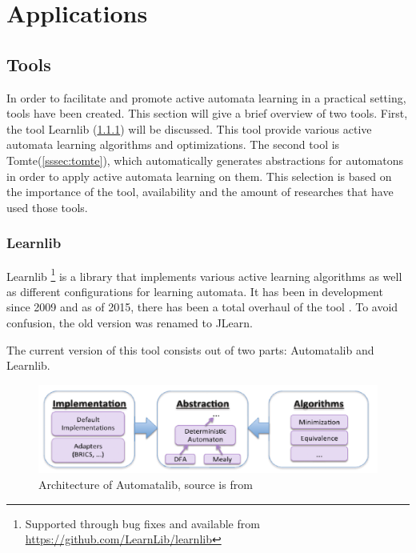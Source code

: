 \documentclass[multi,crop=false,class=article]{standalone}
\begin{document}
\section{Applications}
\label{sec:applications}


\subsection{Tools}
\label{ssec:tools}

In order to facilitate and promote active automata learning in a practical 
setting, tools have been created. This section will give a brief overview of
two tools. First, the tool Learnlib (\ref{sssec:learnlib}) will be discussed. 
This tool provide various active automata learning algorithms and 
optimizations. The second tool is Tomte(\ref{sssec:tomte}), which automatically 
generates abstractions for automatons in order to apply active automata 
learning on them. This selection is based on the importance of the tool, 
availability and the amount of researches that have used those tools.

\subsubsection{Learnlib}
\label{sssec:learnlib}

Learnlib  \footnote{Supported through bug fixes and available from 
\url{https://github.com/LearnLib/learnlib}} is a library that implements 
various active 
learning algorithms as well as different configurations for learning 
automata. It has been in development since 2009 \cite{Raffelt2009} and as of 
2015, there has been a total overhaul of the tool \cite{Isberner2015}. To avoid 
confusion, the old version was renamed to JLearn. 

The current version of this tool consists out of two parts: Automatalib and 
Learnlib.

\begin{figure}[!ht]
	\includegraphics[width=\textwidth]{Tool_images/automatalib_architecture.png}
	\caption{Architecture of Automatalib, source is from \cite{Isberner2015}}
	\label{fig:automatalib_arch}
\end{figure}
\end{document}

